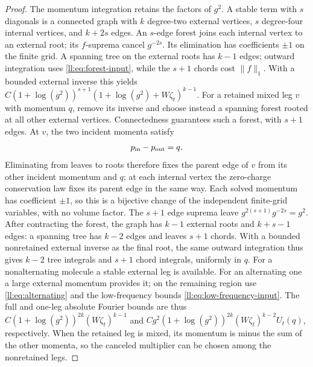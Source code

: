 \documentclass[11pt]{article}
\numberwithin{equation}{section}
\theoremstyle{remark}
\begin{document}
\begin{proof}
The momentum integration retains the factors of \(g^2\).
A stable term with \(s\) diagonals is a connected graph with
\(k\) degree-two external vertices, \(s\) degree-four internal
vertices, and \(k+2s\) edges. An \(s\)-edge forest joins each
internal vertex to an external root; its \(f\)-suprema cancel
\(g^{-2s}\). Its elimination has coefficients \(\pm1\) on the
finite grid. A spanning tree on the external roots has \(k-1\)
edges; outward integration uses \eqref{ll:eq:forest-input}, while
the \(s+1\) chords cost \(\|f\|_1\). With a bounded external
inverse this yields \(C(1+\log(g^2))^{s+1}
(1+\log(g^2)+W\zeta_t)^{k-1}\).
For a retained mixed leg $v$ with momentum $q$, remove its inverse
and choose instead a spanning forest rooted at all other external
vertices. Connectedness guarantees such a forest, with $s+1$ edges.
At $v$, the two incident momenta satisfy
\[
 p_{\rm in}-p_{\rm out}=q.
\]
Eliminating from leaves to roots therefore fixes the parent edge of
$v$ from its other incident momentum and $q$; at each internal vertex
the zero-charge conservation law fixes its parent edge in the same way.
Each solved momentum has coefficient $\pm1$, so this is a bijective
change of the independent finite-grid variables, with no volume factor.
The $s+1$ edge suprema leave $g^{2(s+1)}g^{-2s}=g^2$.
After contracting the forest, the graph has $k-1$ external roots and
$k+s-1$ edges: a spanning tree has $k-2$ edges and leaves $s+1$ chords.
With a bounded nonretained external inverse as the final root, the same
outward integration thus gives $k-2$ tree integrals and $s+1$ chord
integrals, uniformly in $q$.
For a nonalternating molecule a stable external leg is available.
For an alternating one a large external momentum provides it; on
the remaining region use \eqref{ll:eq:alternating} and the
low-frequency bounds \eqref{ll:eq:low-frequency-input}.
The full and one-leg absolute Fourier bounds are thus
\(C(1+\log(g^2))^{2k}(W\zeta_t)^{k-1}\) and
\(Cg^2(1+\log(g^2))^{2k}(W\zeta_t)^{k-2}U_t(q)\), respectively.
When the retained leg is mixed, its momentum is minus the sum of
the other momenta, so the canceled multiplier can be chosen among
the nonretained legs.


\end{proof}
\end{document}

